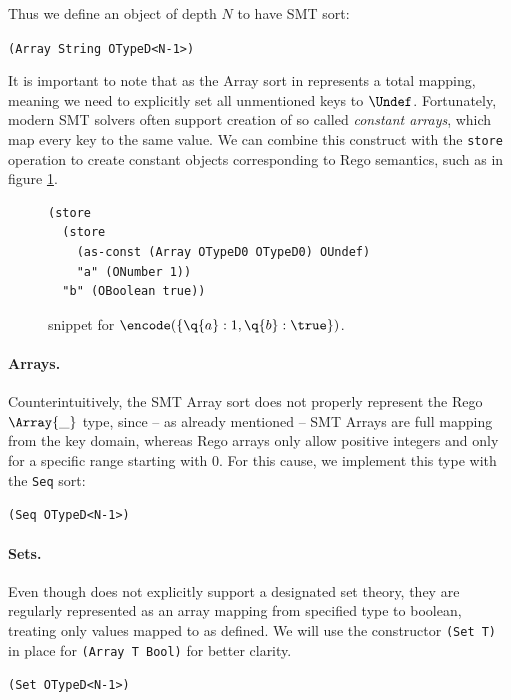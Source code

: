 Thus we define an object of depth $N$ to have SMT sort:
\begin{center}
  \texttt{(Array String OTypeD<N-1>)}
\end{center}

It is important to note that as the Array sort in \smtlib represents a total mapping, meaning we need to explicitly set all unmentioned keys to $\Undef$.
Fortunately, modern SMT solvers often support creation of so called \emph{constant arrays}, which map every key to the same value.
We can combine this construct with the \texttt{store} operation to create constant objects corresponding to Rego semantics, such as in figure \ref{f:cons-obj}.

\begin{figure}
  \label{f:cons-obj}
  \caption{\smtlib snippet for $\encode(\{\q{a}: 1, \q{b}: \true\})$.}
\begin{lstlisting}[language=SMT]
(store
  (store
    (as-const (Array OTypeD0 OTypeD0) OUndef)
    "a" (ONumber 1))
  "b" (OBoolean true))
\end{lstlisting}
\end{figure}

\paragraph{Arrays.}
Counterintuitively, the SMT Array sort does not properly represent the Rego $\Array{\_}$ type, since -- as already mentioned -- SMT Arrays are full mapping from the key domain, whereas Rego arrays only allow positive integers and only for a specific range starting with $0$.
For this cause, we implement this type with the \texttt{Seq} sort:
\begin{center}
  \texttt{(Seq OTypeD<N-1>)}
\end{center}

\paragraph{Sets.}
Even though \ziii does not explicitly support a designated set theory, they are regularly represented as an array mapping from specified type to boolean, treating only values mapped to \true as defined.
We will use the constructor \texttt{(Set T)} in place for \texttt{(Array T Bool)} for better clarity.
\begin{center}
  \texttt{(Set OTypeD<N-1>)}
\end{center}

